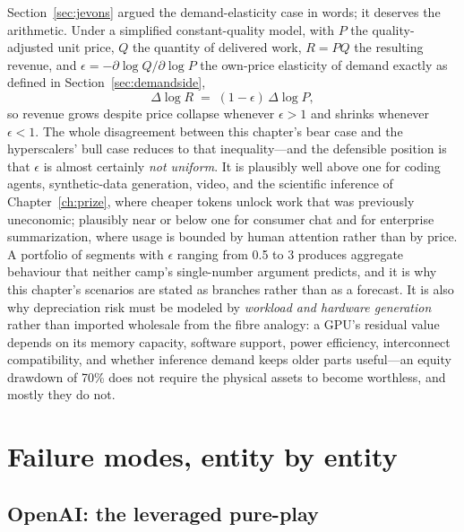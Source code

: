 Section~\ref{sec:jevons} argued the demand-elasticity case in words; it deserves the arithmetic. Under a simplified constant-quality model, with $P$ the quality-adjusted unit price, $Q$ the quantity of delivered work, $R = PQ$ the resulting revenue, and $\epsilon = -\partial\log Q/\partial\log P$ the own-price elasticity of demand exactly as defined in Section~\ref{sec:demandside},
\[
\Delta \log R \;=\; (1-\epsilon)\,\Delta \log P ,
\]
so revenue grows despite price collapse whenever $\epsilon > 1$ and shrinks whenever $\epsilon < 1$. The whole disagreement between this chapter's bear case and the hyperscalers' bull case reduces to that inequality---and the defensible position is that $\epsilon$ is almost certainly \emph{not uniform}. It is plausibly well above one for coding agents, synthetic-data generation, video, and the scientific inference of Chapter~\ref{ch:prize}, where cheaper tokens unlock work that was previously uneconomic; plausibly near or below one for consumer chat and for enterprise summarization, where usage is bounded by human attention rather than by price. A portfolio of segments with $\epsilon$ ranging from 0.5 to 3 produces aggregate behaviour that neither camp's single-number argument predicts, and it is why this chapter's scenarios are stated as branches rather than as a forecast. It is also why depreciation risk must be modeled by \emph{workload and hardware generation} rather than imported wholesale from the fibre analogy: a GPU's residual value depends on its memory capacity, software support, power efficiency, interconnect compatibility, and whether inference demand keeps older parts useful---an equity drawdown of 70\% does not require the physical assets to become worthless, and mostly they do not.

\section{Failure modes, entity by entity}
\label{sec:entities}

\subsection{OpenAI: the leveraged pure-play}

